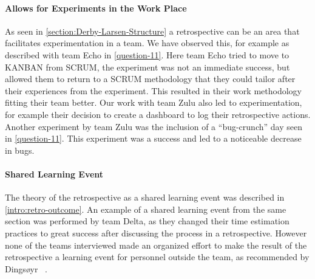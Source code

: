 \paragraph{Allows for Experiments in the Work Place}
\label{section:experiments-in-work-place}
As seen in \autoref{section:Derby-Larsen-Structure} a retrospective can be an area that facilitates experimentation in a team. We have observed this, for example as described with team Echo in \autoref{question-11}. Here team Echo tried to move to KANBAN from SCRUM, the experiment was not an immediate success, but allowed them to return to a SCRUM methodology that they could tailor after their experiences from the experiment. This resulted in their work methodology fitting their team better. Our work with team Zulu also led to experimentation, for example their decision to create a dashboard to log their retrospective actions. Another experiment by team Zulu was the inclusion of a ``bug-crunch'' day seen in \autoref{question-11}. This experiment was a success and led to a noticeable decrease in bugs.

\paragraph{Shared Learning Event}
The theory of the retrospective as a shared learning event was described in \autoref{intro:retro-outcome}.  An example of a shared learning event from the same section was performed by team Delta, as they changed their time estimation practices to great success after discussing the process in a retrospective. However none of the teams interviewed made an organized effort to make the result of the retrospective a learning event for personnel outside the team, as recommended by Dingsøyr ~\cite{Dingsoyr2004}.

